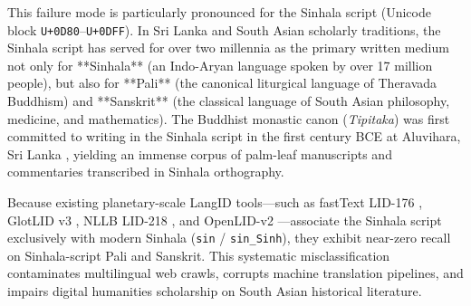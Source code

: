 \documentclass[11pt]{article}
\begin{document}
This failure mode is particularly pronounced for the Sinhala script (Unicode block \texttt{U+0D80}--\texttt{U+0DFF}). In Sri Lanka and South Asian scholarly traditions, the Sinhala script has served for over two millennia as the primary written medium not only for **Sinhala** (an Indo-Aryan language spoken by over 17 million people), but also for **Pali** (the canonical liturgical language of Theravada Buddhism) and **Sanskrit** (the classical language of South Asian philosophy, medicine, and mathematics). The Buddhist monastic canon (\textit{Tipitaka}) was first committed to writing in the Sinhala script in the first century BCE at Aluvihara, Sri Lanka \cite{norman1983pali}, yielding an immense corpus of palm-leaf manuscripts and commentaries transcribed in Sinhala orthography.

Because existing planetary-scale LangID tools—such as fastText LID-176 \cite{joulin2017bag}, GlotLID v3 \cite{kargaran2023glotlid}, NLLB LID-218 \cite{nllb2022}, and OpenLID-v2 \cite{burchell2023openlid}—associate the Sinhala script exclusively with modern Sinhala (\texttt{sin} / \texttt{sin\_Sinh}), they exhibit near-zero recall on Sinhala-script Pali and Sanskrit. This systematic misclassification contaminates multilingual web crawls, corrupts machine translation pipelines, and impairs digital humanities scholarship on South Asian historical literature.
\end{document}
